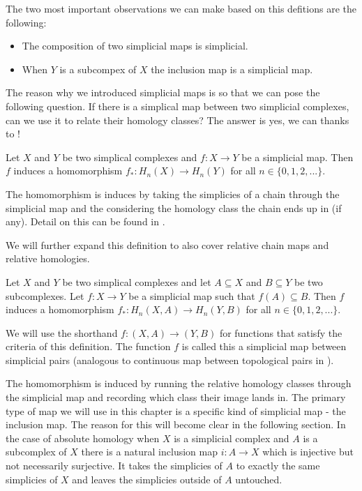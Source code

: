 The two most important observations we can make based on this defitions are the following:

\begin{itemize}
    \item The composition of two simplicial maps is simplicial.
    \item When $Y$ is a subcompex of $X$ the inclusion map is a simplicial map.
\end{itemize}


The reason why we introduced simplicial maps is so that we can pose the following question. If there is a simplical map between two simplicial complexes, can we use it to relate their homology classes? The answer is yes, we can thanks to \cite{combinatorial-algebraic-topology}!



\begin{defn} Let $X$ and $Y$ be two simplical complexes and $f: X \to Y$ be a simplicial map. Then $f$ induces a homomorphism $f_*: H_n(X) \to H_n(Y)$ for all $n \in \{0, 1, 2, ...\}$. \end{defn}

The homomorphism is induces by taking the simplicies of a chain through the simplicial map and the considering the homology class the chain ends up in (if any). Detail on this can be found in \cite{combinatorial-algebraic-topology}.

We will further expand this definition to also cover relative chain maps and relative homologies.

\begin{defn} Let $X$ and $Y$ be two simplical complexes and let $A \subseteq X$ and $B \subseteq Y$ be two subcomplexes. Let $f: X \to Y$ be a simplicial map such that $f(A) \subseteq B$. Then $f$ induces a homomorphism $f_*: H_n(X, A) \to H_n(Y, B)$ for all $n \in \{0, 1, 2, ...\}$. \end{defn}

We will use the shorthand $f: (X, A) \to (Y, B)$ for functions that satisfy the criteria of this definition. The function $f$ is called this a simplicial map between simplicial pairs (analogous to continuous map between topological pairs in \cite{algebraic-topology}). 


The homomorphism is induced by running the relative homology classes through the simplicial map and recording which class their image lands in. The primary type of map we will use in this chapter is a specific kind of simplicial map - the inclusion map. The reason for this will become clear in the following section. In the case of absolute homology when $X$ is a simplicial complex and $A$ is a subcomplex of $X$ there is a natural inclusion map $i: A \to X$ which is injective but not necessarily surjective. It takes the simplicies of $A$ to exactly the same simplicies of $X$ and leaves the simplicies outside of $A$ untouched. 

